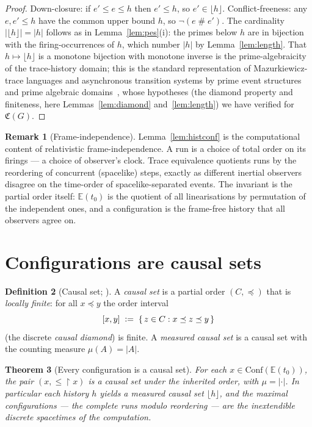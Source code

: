\documentclass[11pt]{article}
\theoremstyle{definition}
\newtheorem{definition}{Definition}[section]
\newtheorem{remark}[definition]{Remark}
\theoremstyle{plain}
\newtheorem{theorem}[definition]{Theorem}
\newcommand{\Cost}{\mathfrak{C}}
\newcommand{\Conf}{\mathrm{Conf}}
\newcommand{\Ev}{\mathbb{E}}
\newcommand{\confl}{\mathrel{\#}}                  %
\newcommand{\meas}{\mu}
\newcommand{\restrict}{\!\restriction\!}
\newcommand{\defeq}{\;\mathrel{\vcentcolon=}\;}
\theoremstyle{remark}
\begin{document}
\begin{proof}
Down-closure: if $e' \le e \le h$ then $e' \le h$, so $e' \in
\lfloor h\rfloor$. Conflict-freeness: any $e, e' \le h$ have the common
upper bound $h$, so $\lnot(e \confl e')$. The cardinality
$|\lfloor h\rfloor| = |h|$ follows as in Lemma~\ref{lem:pes}(i): the
primes below $h$ are in bijection with the firing-occurrences of $h$,
which number $|h|$ by Lemma~\ref{lem:length}. That $h \mapsto
\lfloor h\rfloor$ is a monotone bijection with monotone inverse is the
prime-algebraicity of the trace-history domain; this is the standard
representation of Mazurkiewicz-trace languages and asynchronous
transition systems by prime event structures and prime algebraic
domains~\cite{NPW,WinskelES,WinskelNielsen,Mazurkiewicz}, whose
hypotheses (the diamond property and finiteness, here
Lemmas~\ref{lem:diamond} and~\ref{lem:length}) we have verified for
$\Cost(G)$.
\end{proof}

\begin{remark}[Frame-independence]
Lemma~\ref{lem:histconf} is the computational content of relativistic
frame-independence. A run is a choice of total order on its firings --- a
choice of observer's clock. Trace equivalence quotients runs by the
reordering of concurrent (spacelike) steps, exactly as different inertial
observers disagree on the time-order of spacelike-separated events. The
invariant is the partial order itself: $\Ev(t_0)$ is the quotient of all
linearisations by permutation of the independent ones, and a
configuration is the frame-free history that all observers agree on.
\end{remark}

\section{Configurations are causal sets}
\label{sec:causet}

\begin{definition}[Causal set; {\cite{BLMS}}]
\label{def:causet}
A \emph{causal set} is a partial order $(C, \preceq)$ that is
\emph{locally finite}: for all $x \preceq y$ the order interval
\[
  [x,y] \defeq \{\, z \in C : x \preceq z \preceq y \,\}
\]
(the discrete \emph{causal diamond}) is finite. A \emph{measured causal
set} is a causal set with the counting measure $\meas(A) = |A|$.
\end{definition}

\begin{theorem}[Every configuration is a causal set]
\label{thm:causet}
For each $x \in \Conf(\Ev(t_0))$, the pair $(x, \le\restrict x)$ is a
causal set under the inherited order, with $\meas = |\cdot|$. In
particular each history $h$ yields a measured causal set
$\lfloor h\rfloor$, and the maximal configurations --- the complete runs
modulo reordering --- are the inextendible discrete spacetimes of the
computation.
\end{theorem}
\end{document}
